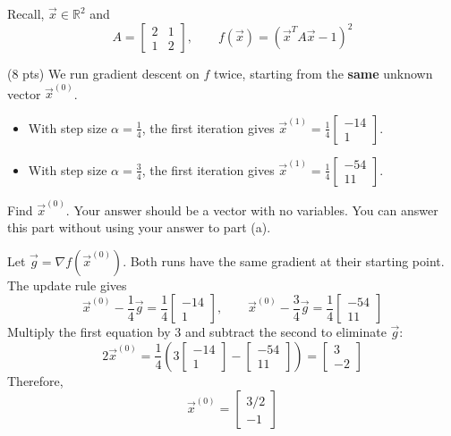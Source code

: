 \documentclass[11pt]{article}
\providecommand{\desmosembed}[1]{}
\begin{document}
\begin{prob}[(18 pts)]
\begin{subprob}
\begin{enumerate}[label=(\roman*)]
\begin{solution}
\desmosembed{8uyka4tjla}
\end{solution}
\end{enumerate}
\end{subprob}\newpage

Recall, $\vec x\in\mathbb R^2$ and
\[
A=\begin{bmatrix}2&1\\1&2\end{bmatrix},\qquad
f(\vec x)=\left(\vec x^TA\vec x-1\right)^2
\]
\begin{subprob}(8 pts)
We run gradient descent on $f$ twice, starting from the \textbf{same} unknown vector $\vec x^{(0)}$.
\begin{itemize}[itemsep=0.6em]
\item With step size $\alpha=\frac14$, the first iteration gives $\vec x^{(1)}=\frac14\begin{bmatrix}-14\\1\end{bmatrix}$.
\item With step size $\alpha=\frac34$, the first iteration gives $\vec x^{(1)}=\frac14\begin{bmatrix}-54\\11\end{bmatrix}$.
\end{itemize}
Find $\vec x^{(0)}$. Your answer should be a vector with no variables. You can answer this part without using your answer to part (a).\par\vspace{0.2em}

\begin{solution}
Let $\vec g=\nabla f(\vec x^{(0)})$. Both runs have the same gradient at their starting point. The update rule gives
\[
\vec x^{(0)}-\frac14\vec g=\frac14\begin{bmatrix}-14\\1\end{bmatrix},\qquad
\vec x^{(0)}-\frac34\vec g=\frac14\begin{bmatrix}-54\\11\end{bmatrix}
\]
Multiply the first equation by $3$ and subtract the second to eliminate $\vec g$:
\[
2\vec x^{(0)}=\frac14\left(3\begin{bmatrix}-14\\1\end{bmatrix}-\begin{bmatrix}-54\\11\end{bmatrix}\right)
=\begin{bmatrix}3\\-2\end{bmatrix}
\]
Therefore,
\[
\boxed{\vec x^{(0)}=\begin{bmatrix}3/2\\-1\end{bmatrix}}
\]
\end{solution}
\end{subprob}
\end{prob}
\end{document}
